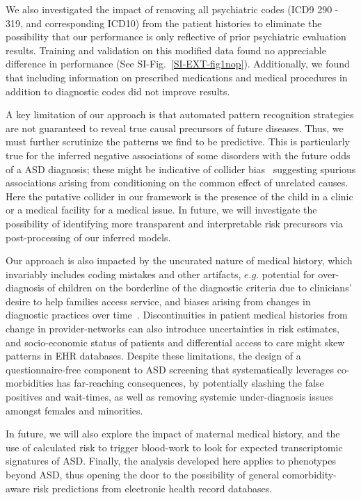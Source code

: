 \documentclass[onecolumn,10pt]{IEEEtran}
\begin{document}
We also investigated the impact of removing all psychiatric codes (ICD9 290 - 319, and corresponding ICD10) from the patient histories to eliminate the possibility that our performance is only reflective of prior psychiatric evaluation results. Training and validation on this modified data found  no appreciable difference in performance (See SI-Fig.~\ref{SI-EXT-fig1nop}).
Additionally, we found that including information on prescribed medications and medical procedures in addition to diagnostic codes did not improve results.

  A key  limitation of our approach is that automated pattern recognition strategies are not guaranteed to reveal true causal precursors of future diseases. Thus, we must  further scrutinize the patterns we find to be predictive. This is particularly true for the inferred  negative associations of some disorders  with the future odds of a ASD diagnosis; these might be indicative of collider bias~\cite{berkson1946limitations} suggesting spurious associations arising from conditioning on the common effect of unrelated causes. Here the putative collider in our framework is the presence of the child in a clinic or a medical facility for a medical issue. In future, we will  investigate the possibility of identifying more transparent and interpretable risk precursors via post-processing of our inferred models.

Our approach is also impacted by the uncurated nature of medical history, which invariably includes coding mistakes and other artifacts, $e.g.$   potential for  over-diagnosis of  children on the borderline of the diagnostic criteria due to clinicians' desire to help families access service, and biases arising from changes in diagnostic practices over time~\cite{10.1001/jamapsychiatry.2019.1956}. Discontinuities in patient medical histories from change in provider-networks  can also introduce  uncertainties  in risk estimates, and socio-economic status of patients and differential access to care  might skew patterns in EHR databases. Despite these limitations, the design of a questionnaire-free component to ASD screening  that systematically leverages co-morbidities  has far-reaching consequences, by potentially slashing the false positives and wait-times, as well as removing systemic under-diagnosis issues amongst females and minorities. 

In future, we will also explore the impact of  maternal medical history, and the  use of calculated risk to trigger   blood-work to look for expected  transcriptomic  signatures of ASD. Finally,  the analysis developed here applies to phenotypes beyond ASD, thus opening the door to the possibility of  general  comorbidity-aware risk predictions  from electronic health record databases. 
\end{document}
